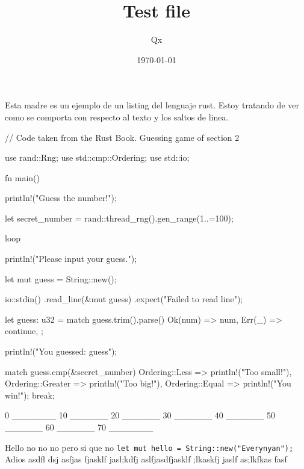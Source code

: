\documentclass[pagecolor=false, pagesize=a5paper, stretchmode]{qx-files/qx-notes}
\title{Test file}
\author{Qx}
\date{\today}
\begin{document}
  \maketitle

  Esta madre es un ejemplo de un listing del lenguaje rust. Estoy tratando de ver
  como se comporta con respecto al texto y los saltos de linea.


  \begin{codeblock}
    // Code taken from the Rust Book. Guessing game of section 2

    use rand::Rng;
    use std::cmp::Ordering;
    use std::io;

    fn main() {
      println!("Guess the number!");

      let secret_number = rand::thread_rng().gen_range(1..=100);

      loop {
        println!("Please input your guess.");

        let mut guess = String::new();

        io::stdin()
            .read_line(&mut guess)
            .expect("Failed to read line");

        let guess: u32 = match guess.trim().parse() {
          Ok(num) => num,
          Err(_) => continue,
        };

        println!("You guessed: {guess}");

        match guess.cmp(&secret_number) {
          Ordering::Less => println!("Too small!"),
          Ordering::Greater => println!("Too big!"),
          Ordering::Equal => {
            println!("You win!");
            break;
          }
        }
      }
    }
  \end{codeblock}


  \begin{codeblock}
    0 _______ 10 ______ 20 ______ 30 ______ 40 ______ 50 ______ 60 ______ 70 _______
  \end{codeblock}

  Hello no no no pero si que no
  \texttt{let mut hello = String::new("Everynyan");}
  Adios asdfl dsj asfjas fjasklf jasl;kdfj aslfjasdfjasklf ;lkaskfj jaslf as;lkfkas fasf 
\end{document}
